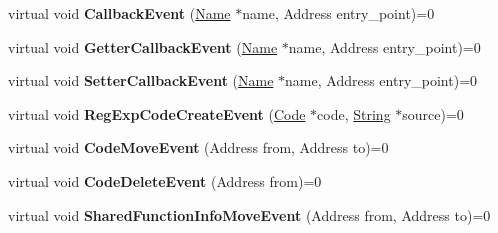 \begin{DoxyCompactItemize}
\item 
\hypertarget{classv8_1_1internal_1_1_code_event_listener_a6196afb9679f746e0b87ca6f818daf87}{}virtual void {\bfseries Callback\+Event} (\hyperlink{classv8_1_1internal_1_1_name}{Name} $\ast$name, Address entry\+\_\+point)=0\label{classv8_1_1internal_1_1_code_event_listener_a6196afb9679f746e0b87ca6f818daf87}

\item 
\hypertarget{classv8_1_1internal_1_1_code_event_listener_a75ddb9c2237e17f9cced780be7934d26}{}virtual void {\bfseries Getter\+Callback\+Event} (\hyperlink{classv8_1_1internal_1_1_name}{Name} $\ast$name, Address entry\+\_\+point)=0\label{classv8_1_1internal_1_1_code_event_listener_a75ddb9c2237e17f9cced780be7934d26}

\item 
\hypertarget{classv8_1_1internal_1_1_code_event_listener_a84eb541598ca417e605faf8da02aa93b}{}virtual void {\bfseries Setter\+Callback\+Event} (\hyperlink{classv8_1_1internal_1_1_name}{Name} $\ast$name, Address entry\+\_\+point)=0\label{classv8_1_1internal_1_1_code_event_listener_a84eb541598ca417e605faf8da02aa93b}

\item 
\hypertarget{classv8_1_1internal_1_1_code_event_listener_a9d4cb748ff60e1b70fe3e1efe50ab2a3}{}virtual void {\bfseries Reg\+Exp\+Code\+Create\+Event} (\hyperlink{classv8_1_1internal_1_1_code}{Code} $\ast$code, \hyperlink{classv8_1_1internal_1_1_string}{String} $\ast$source)=0\label{classv8_1_1internal_1_1_code_event_listener_a9d4cb748ff60e1b70fe3e1efe50ab2a3}

\item 
\hypertarget{classv8_1_1internal_1_1_code_event_listener_a25f5f49064b5a57b868b9e1b9fa2e281}{}virtual void {\bfseries Code\+Move\+Event} (Address from, Address to)=0\label{classv8_1_1internal_1_1_code_event_listener_a25f5f49064b5a57b868b9e1b9fa2e281}

\item 
\hypertarget{classv8_1_1internal_1_1_code_event_listener_a540bc181c7b442d127e40170cb507bc6}{}virtual void {\bfseries Code\+Delete\+Event} (Address from)=0\label{classv8_1_1internal_1_1_code_event_listener_a540bc181c7b442d127e40170cb507bc6}

\item 
\hypertarget{classv8_1_1internal_1_1_code_event_listener_a77afc22a53334cc9c5c789483bae6529}{}virtual void {\bfseries Shared\+Function\+Info\+Move\+Event} (Address from, Address to)=0\label{classv8_1_1internal_1_1_code_event_listener_a77afc22a53334cc9c5c789483bae6529}


\end{DoxyCompactItemize}
